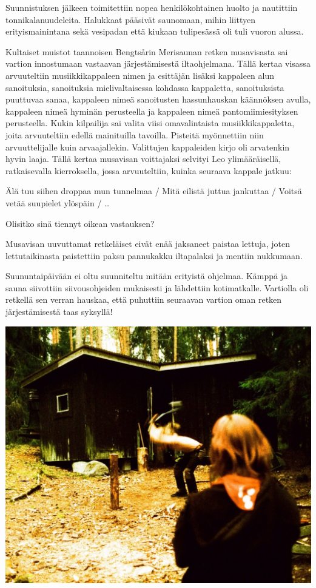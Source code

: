 \begin{multicols}{2}
Suunnistuksen jälkeen toimitettiin nopea henkilökohtainen huolto ja nautittiin tonnikalanuudeleita. Halukkaat pääsivät saunomaan, mihin liittyen erityismainintana sekä vesipadan että kiukaan tulipesässä oli tuli vuoron alussa.

Kultaiset muistot taannoisen Bengtsårin Merisaunan retken musavisasta sai vartion innostumaan vastaavan järjestämisestä iltaohjelmana. Tällä kertaa visassa arvuuteltiin musiikkikappaleen nimen ja esittäjän lisäksi kappaleen alun sanoituksia, sanoituksia mielivaltaisessa kohdassa kappaletta, sanoituksista puuttuvaa sanaa, kappaleen nimeä sanoitusten hassunhauskan käännöksen avulla, kappaleen nimeä hyminän perusteella ja kappaleen nimeä pantomiimiesityksen perusteella. Kukin kilpailija sai valita viisi omavalintaista musiikkikappaletta, joita arvuuteltiin edellä mainituilla tavoilla. Pisteitä myönnettiin niin arvuuttelijalle kuin arvaajallekin. Valittujen kappaleiden kirjo oli arvatenkin hyvin laaja. Tällä kertaa musavisan voittajaksi selvityi Leo ylimääräisellä, ratkaisevalla kierroksella, jossa arvuuteltiin, kuinka seuraava kappale jatkuu: 

Älä tuu siihen droppaa mun tunnelmaa / Mitä eilistä juttua jankuttaa / Voitsä vetää suupielet ylöspäin / \ldots

Olisitko sinä tiennyt oikean vastauksen?

Musavisan uuvuttamat retkeläiset eivät enää jaksaneet paistaa lettuja, joten lettutaikinasta paistettiin paksu pannukakku iltapalaksi ja mentiin nukkumaan.

Suununtaipäivään ei oltu suunniteltu mitään erityistä ohjelmaa. Kämppä ja sauna siivottiin siivousohjeiden mukaisesti ja lähdettiin kotimatkalle. Vartiolla oli retkellä sen verran hauskaa, että puhuttiin seuraavan vartion oman retken järjestämisestä taas syksyllä!

\noindent\includegraphics[width=\linewidth]{assets/vene02}


\end{multicols}
